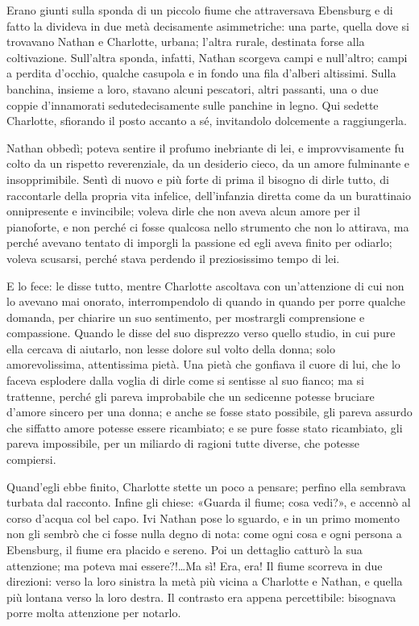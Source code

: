 \documentclass[a4paper,oneside,11pt]{memoir}
\begin{document}
Erano giunti sulla sponda di un piccolo fiume che attraversava Ebensburg e di
fatto la divideva in due metà decisamente asimmetriche: una parte, quella dove
si trovavano Nathan e Charlotte, urbana; l'altra rurale, destinata forse alla
coltivazione. Sull'altra sponda, infatti, Nathan scorgeva campi e null'altro;
campi a perdita d'occhio, qualche casupola e in fondo una fila d'alberi
altissimi. Sulla banchina, insieme a loro, stavano alcuni pescatori, altri
passanti, una o due coppie d'innamorati sedutedecisamente sulle panchine in
legno. Qui sedette Charlotte, sfiorando il posto accanto a sé, invitandolo
dolcemente a raggiungerla.

Nathan obbedì; poteva sentire il profumo inebriante di lei, e improvvisamente fu
colto da un rispetto reverenziale, da un desiderio cieco, da un amore fulminante
e insopprimibile. Sentì di nuovo e più forte di prima il bisogno di dirle tutto,
di raccontarle della propria vita infelice, dell'infanzia diretta come da un
burattinaio onnipresente e invincibile; voleva dirle che non aveva alcun amore
per il pianoforte, e non perché ci fosse qualcosa nello strumento che non lo
attirava, ma perché avevano tentato di imporgli la passione ed egli aveva finito
per odiarlo; voleva scusarsi, perché stava perdendo il preziosissimo tempo di
lei.

E lo fece: le disse tutto, mentre Charlotte ascoltava con un'attenzione di cui
non lo avevano mai onorato, interrompendolo di quando in quando per porre
qualche domanda, per chiarire un suo sentimento, per mostrargli comprensione e
compassione. Quando le disse del suo disprezzo verso quello studio, in cui pure
ella cercava di aiutarlo, non lesse dolore sul volto della donna; solo
amorevolissima, attentissima pietà. Una pietà che gonfiava il cuore di lui, che
lo faceva esplodere dalla voglia di dirle come si sentisse al suo fianco; ma si
trattenne, perché gli pareva improbabile che un sedicenne potesse bruciare
d'amore sincero per una donna; e anche se fosse stato possibile, gli pareva
assurdo che siffatto amore potesse essere ricambiato; e se pure fosse stato
ricambiato, gli pareva impossibile, per un miliardo di ragioni tutte diverse,
che potesse compiersi.

Quand'egli ebbe finito, Charlotte stette un poco a pensare; perfino ella
sembrava turbata dal racconto. Infine gli chiese: «Guarda il fiume; cosa vedi?»,
e accennò al corso d'acqua col bel capo. Ivi Nathan pose lo sguardo, e in un
primo momento non gli sembrò che ci fosse nulla degno di nota: come ogni cosa e
ogni persona a Ebensburg, il fiume era placido e sereno. Poi un dettaglio
catturò la sua attenzione; ma poteva mai essere?!\dots Ma sì! Era, era! Il fiume
scorreva in due direzioni: verso la loro sinistra la metà più vicina a Charlotte
e Nathan, e quella più lontana verso la loro destra. Il contrasto era appena
percettibile: bisognava porre molta attenzione per notarlo.
\end{document}
